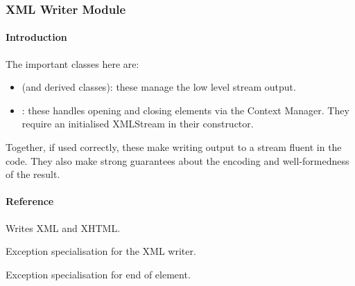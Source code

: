 \documentclass[letterpaper,10pt,english]{sphinxmanual}
\begin{document}
\subsubsection{XML Writer Module}
\label{\detokenize{ref/util/XmlWrite:xml-writer-module}}\label{\detokenize{ref/util/XmlWrite::doc}}

\paragraph{Introduction}
\label{\detokenize{ref/util/XmlWrite:introduction}}
The important classes here are:
\begin{itemize}
\item {} 
 (and derived classes): these manage the low level stream output.

\item {} 
: these handles opening and closing elements via the Context Manager. They require an initialised XMLStream in their constructor.

\end{itemize}

Together, if used correctly, these make writing output to a stream fluent in the code. They also make strong guarantees about the encoding and well-formedness of the result.


\paragraph{Reference}
\label{\detokenize{ref/util/XmlWrite:module-TotalDepth.util.XmlWrite}}\label{\detokenize{ref/util/XmlWrite:reference}}
Writes XML and XHTML.

\begin{fulllineitems}
\label{\detokenize{ref/util/XmlWrite:TotalDepth.util.XmlWrite.ExceptionXml}}
Exception specialisation for the XML writer.

\end{fulllineitems}


\begin{fulllineitems}
\label{\detokenize{ref/util/XmlWrite:TotalDepth.util.XmlWrite.ExceptionXmlEndElement}}
Exception specialisation for end of element.

\end{fulllineitems}
\end{document}
